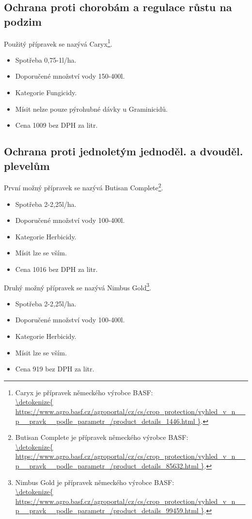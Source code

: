 \documentclass[11pt,a4paper,titlepage]{article}
\begin{document}
\subsection{Ochrana proti chorobám a regulace růstu na podzim}
Použitý přípravek se nazývá Caryx\footnote{Caryx je přípravek německého výrobce BASF: \\\url{\detokenize{
https://www.agro.basf.cz/agroportal/cz/cs/crop_protection/vyhled_v_n__p__pravk__podle_parametr_/product_details_1446.html
}}.}.
\begin{itemize}
  \item Spotřeba 0,75-1l/ha.
  \item Doporučené množství vody 150-400l.
  \item Kategorie Fungicidy.
  \item Mísit nelze pouze pýrohubné dávky u Graminicidů.
  \item Cena 1009 bez DPH za litr.
\end{itemize}

\subsection{Ochrana proti jednoletým jednoděl. a dvouděl. plevelům}
První možný přípravek se nazývá Butisan Complete\footnote{Butisan Complete je přípravek německého výrobce BASF: \\\url{\detokenize{
https://www.agro.basf.cz/agroportal/cz/cs/crop_protection/vyhled_v_n__p__pravk__podle_parametr_/product_details_85632.html
}}.}.
\begin{itemize}
  \item Spotřeba 2-2,25l/ha.
  \item Doporučené množství vody 100-400l.
  \item Kategorie Herbicidy.
  \item Mísit lze se vším.
  \item Cena 1016 bez DPH za litr.
\end{itemize}

Druhý možný přípravek se nazývá Nimbus Gold\footnote{Nimbus Gold je přípravek německého výrobce BASF: \\\url{\detokenize{
https://www.agro.basf.cz/agroportal/cz/cs/crop_protection/vyhled_v_n__p__pravk__podle_parametr_/product_details_99459.html
}}.}.
\begin{itemize}
  \item Spotřeba 2-2,25l/ha.
  \item Doporučené množství vody 100-400l.
  \item Kategorie Herbicidy.
  \item Mísit lze se vším.
  \item Cena 919 bez DPH za litr.
\end{itemize}
\end{document}
